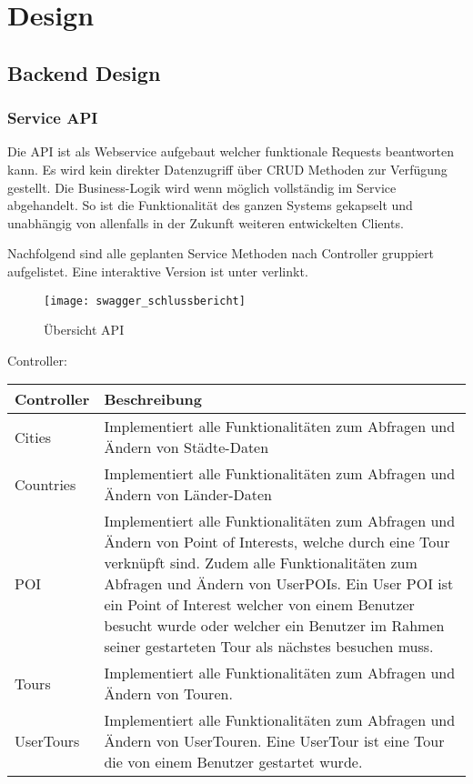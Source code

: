 \section{Design}\label{design}
\subsection{Backend Design}\label{backend-design}
\subsubsection{Service API}\label{service-api}
Die API ist als Webservice aufgebaut welcher funktionale Requests beantworten kann. Es wird kein direkter Datenzugriff
\"uber CRUD Methoden zur Verf\"ugung gestellt. Die Business-Logik wird wenn m\"oglich vollst\"andig im Service
abgehandelt. So ist die Funktionalit\"at des ganzen Systems gekapselt und unabh\"angig von allenfalls in der Zukunft
weiteren entwickelten Clients.

Nachfolgend sind alle geplanten Service Methoden nach Controller gruppiert aufgelistet. Eine
interaktive Version ist unter  verlinkt.

\begin{figure}
  \centering
  \texttt{[image: swagger\_schlussbericht]}
  \caption{Übersicht API}
\end{figure}

\newpage
Controller:

\begin{longtabu} to \textwidth { | l | X[l] | }
\hline
\textbf{Controller} & \textbf{Beschreibung} \\
\hline
\endhead

Cities & Implementiert alle Funktionalit\"aten zum Abfragen und \"Andern von
  St\"adte-Daten\\ \hline
Countries & Implementiert alle Funktionalit\"aten zum Abfragen und \"Andern von
  L\"ander-Daten\\ \hline
POI & Implementiert alle Funktionalit\"aten zum Abfragen und \"Andern von Point of
Interests, welche durch eine Tour verkn\"upft sind. Zudem alle Funktionalit\"aten zum Abfragen und \"Andern von UserPOIs.
  Ein User POI ist ein Point of Interest welcher von einem Benutzer besucht wurde oder
  welcher ein Benutzer im Rahmen seiner gestarteten Tour als n\"achstes besuchen muss.\\\hline
Tours & Implementiert alle Funktionalit\"aten zum Abfragen und \"Andern von Touren.\\\hline
UserTours & Implementiert alle Funktionalitäten zum Abfragen und Ändern von UserTouren. Eine UserTour ist eine Tour die von einem Benutzer gestartet wurde.\\\hline
\end{longtabu}

